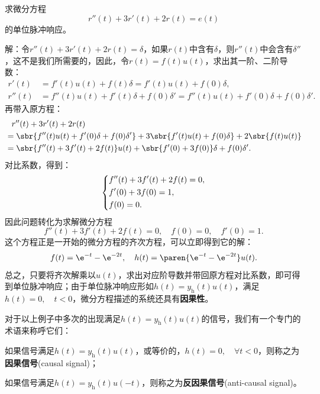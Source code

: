 \begin{example}
    求微分方程
    \begin{equation}
        r''(t)+3r'(t)+2r(t)=e(t)
    \end{equation}
    的单位脉冲响应。

    解：令$r''(t)+3r'(t)+2r(t)=\delta$，如果$r(t)$中含有$\delta$，则$r''(t)$中会含有$\delta''$，这不是我们所需要的，因此，令$r(t)=f(t)u(t)$，求出其一阶、二阶导数：
    \begin{align}
        r'(t)&=f'(t)u(t)+f(t)\delta=f'(t)u(t)+f(0)\delta,\\
        r''(t)&=f''(t)u(t)+f'(t)\delta+f(0)\delta'=f''(t)u(t)+f'(0)\delta+f(0)\delta'.
    \end{align}
    再带入原方程：
    \begin{align}
        &\phantom{=}r''(t)+3r'(t)+2r(t)\nonumber\\
        &=\sbr{f''(t)u(t)+f'(0)\delta+f(0)\delta'}+3\sbr{f'(t)u(t)+f(0)\delta}+2\sbr{f(t)u(t)}\nonumber\\
        &=\sbr{f''(t)+3f'(t)+2f(t)}u(t)+\sbr{f'(0)+3f(0)}\delta+f(0)\delta'.
    \end{align}
    对比系数，得到：
    \begin{equation}
        \begin{dcases}
            f''(t)+3f'(t)+2f(t)=0,\\
            f'(0)+3f(0)=1,\\
            f(0)=0.
        \end{dcases}
    \end{equation}
    因此问题转化为求解微分方程
    \begin{equation}
        f''(t)+3f'(t)+2f(t)=0,\quad f(0)=0,\quad f'(0)=1.
    \end{equation}
    这个方程正是一开始的微分方程的齐次方程，可以立即得到它的解：
    \begin{equation}
        f(t)=\e^{-t}-\e^{-2t},\quad h(t)=\paren{\e^{-t}-\e^{-2t}}u(t).
    \end{equation}
    总之，只要将齐次解乘以$u(t)$，求出对应阶导数并带回原方程对比系数，即可得到单位脉冲响应；由于单位脉冲响应形如$h(t)=y_{\text{h}}(t)u(t)$，满足$h(t)=0,\quad t<0$，微分方程描述的系统还具有\textbf{因果性}。
\end{example}

对于以上例子中多次的出现满足$h(t)=y_{\text{h}}(t)u(t)$的信号，我们有一个专门的术语来称呼它们：

\begin{definition}\label{def:casual_signal}
    如果信号满足$h(t)=y_{\text{h}}(t)u(t)$，或等价的，$h(t)=0,\quad \forall t<0$，则称之为\textbf{因果信号}(causal signal)；

    如果信号满足$h(t)=y_{\text{h}}(t)u(-t)$，则称之为\textbf{反因果信号}(anti-causal signal)。
\end{definition}


